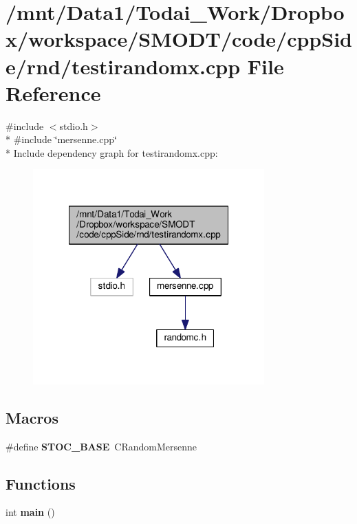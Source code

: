 \section{/mnt/\-Data1/\-Todai\-\_\-\-Work/\-Dropbox/workspace/\-S\-M\-O\-D\-T/code/cpp\-Side/rnd/testirandomx.cpp File Reference}
\label{rnd_2testirandomx_8cpp}
{\ttfamily \#include $<$stdio.\-h$>$}\\*
{\ttfamily \#include \char`\"{}mersenne.\-cpp\char`\"{}}\\*
Include dependency graph for testirandomx.\-cpp\-:\nopagebreak
\begin{figure}[H]
\begin{center}
\leavevmode
\includegraphics[width=252pt]{rnd_2testirandomx_8cpp__incl}
\end{center}
\end{figure}
\subsection*{Macros}
\begin{DoxyCompactItemize}
\item 
\#define {\bf S\-T\-O\-C\-\_\-\-B\-A\-S\-E}~C\-Random\-Mersenne
\end{DoxyCompactItemize}
\subsection*{Functions}
\begin{DoxyCompactItemize}
\item 
int {\bf main} ()
\end{DoxyCompactItemize}


